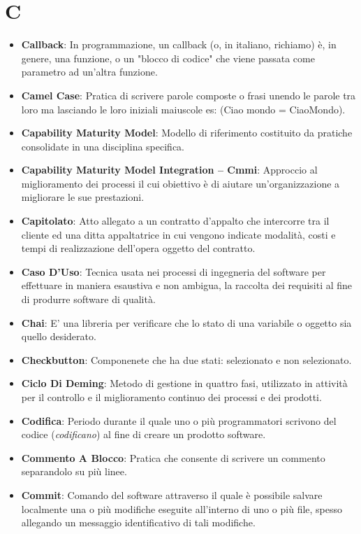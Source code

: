 \section*{C}
\begin{itemize}
	\item
	\textbf{Callback}: In programmazione, un callback (o, in italiano, richiamo) è, in genere, una funzione, o un "blocco di codice" che viene passata come parametro ad un'altra funzione.
	\item
	\textbf{Camel Case}: Pratica di scrivere parole composte o frasi unendo le parole tra loro ma lasciando le loro iniziali maiuscole es: (Ciao mondo = CiaoMondo).
	\item
	\textbf{Capability Maturity Model}: Modello di riferimento costituito da pratiche consolidate in una disciplina specifica.
	\item
	\textbf{Capability Maturity Model Integration -- Cmmi}: Approccio al miglioramento dei processi il cui obiettivo è di aiutare un'organizzazione a migliorare le sue prestazioni.
	\item
	\textbf{Capitolato}: Atto allegato a un contratto d'appalto che intercorre tra il cliente ed una ditta appaltatrice in cui vengono indicate modalità, costi e tempi di realizzazione dell'opera oggetto del contratto.
	\item
	\textbf{Caso D'Uso}: Tecnica usata nei processi di ingegneria del software per effettuare in maniera esaustiva e non ambigua, la raccolta dei requisiti al fine di produrre software di qualità.
	\item
	\textbf{Chai}: E' una libreria per verificare che lo stato di una variabile o oggetto sia quello desiderato.
	\item
	\textbf{Checkbutton}: Componenete che ha due stati: selezionato e non selezionato.
	\item
	\textbf{Ciclo Di Deming}: Metodo di gestione in quattro fasi, utilizzato in attività per il controllo e il miglioramento continuo dei processi e dei prodotti.
	\item
	\textbf{Codifica}: Periodo durante il quale uno o più programmatori scrivono del codice (\textit{codificano}) al fine di creare un prodotto software.
	\item
	\textbf{Commento A Blocco}: Pratica che consente di scrivere un commento separandolo su più linee.
	\item
	\textbf{Commit}: Comando del software  attraverso il quale è possibile salvare localmente una o più modifiche eseguite all'interno di uno o più file, spesso allegando un messaggio identificativo di tali modifiche.

\end{itemize}
